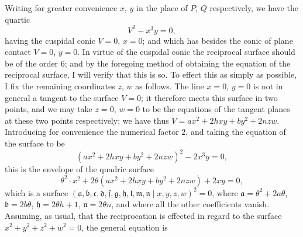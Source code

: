 \documentclass[11pt,a4paper]{article}
\providecommand{\midbar}{\mid}
\begin{document}
Writing for greater convenience $x$, $y$ in the place of $P$, $Q$
respectively, we have the quartic
\[
V^{2} - x^{3} y = 0, \tag{AA}
\]
having the cuspidal conic $V = 0$, $x = 0$; and which has besides the
conic of plane contact $V = 0$, $y = 0$. In virtue of the cuspidal conic
the reciprocal surface should be of the order $6$; and by the foregoing
method of obtaining the equation of the reciprocal surface, I will verify
that this is so. To effect this as simply as possible, I fix the remaining
coordinates $z$, $w$ as follows. The line $x = 0$, $y = 0$ is not in
general a tangent to the surface $V = 0$; it therefore meets this surface
in two points, and we may take $z = 0$, $w = 0$ to be the equations of the
tangent planes at these two points respectively; we have thus
$V = a x^{2} + 2 h x y + b y^{2} + 2 n z w$. Introducing for convenience
the numerical factor $2$, and taking the equation of the surface to be
\[
(a x^{2} + 2 h x y + b y^{2} + 2 n z w)^{2} - 2 x^{3} y = 0,
\]
this is the envelope of the quadric surface
\[
\theta^{2} \cdot x^{2}
+ 2 \theta (a x^{2} + 2 h x y + b y^{2} + 2 n z w)
+ 2 x y = 0,
\]
which is a surface
$(\mathfrak{a}, \mathfrak{b}, \mathfrak{c}, \mathfrak{d},
\mathfrak{f}, \mathfrak{g}, \mathfrak{h},
\mathfrak{l}, \mathfrak{m}, \mathfrak{n}\!\midbar\! x, y, z, w)^{2} = 0$,
where $\mathfrak{a} = \theta^{2} + 2 a \theta$,
$\mathfrak{b} = 2 b \theta$,
$\mathfrak{h} = 2 \theta h + 1$,
$\mathfrak{n} = 2 \theta n$, and where all the other coefficients vanish.
Assuming, as usual, that the reciprocation is effected in regard to the
surface $x^{2} + y^{2} + z^{2} + w^{2} = 0$, the general equation is
\end{document}
